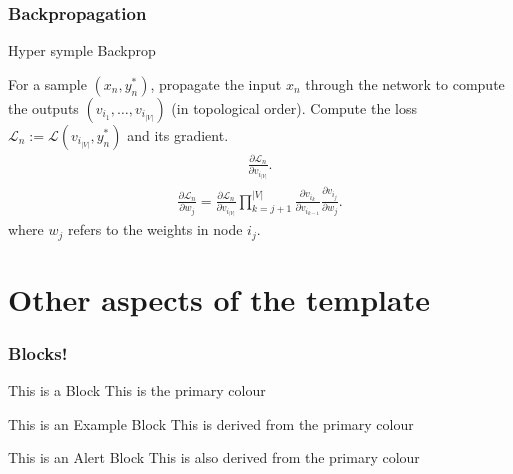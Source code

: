 \documentclass[10pt, aspectratio = 169]{beamer} %
\begin{document}
\begin{frame}
	\frametitle{Backpropagation}
	\begin{algorithm}[H]
		\caption{Hyper symple Backprop}
		\begin{algorithmic}
			\small
			\State For a sample $(x_n ,y^*_n)$, propagate the input $x_n$ through the network to compute the outputs $(v_{i_1}, \ldots, v_{i_{|V|}})$ (in topological order).
			\vspace{0.2cm}
			\State Compute the loss $\mathcal{L}_n := \mathcal{L}(v_{i_{|V|}}, y_n^*)$ and its gradient.
			\begin{align}
				\frac{\partial \mathcal{L}_n}{\partial v_{i_{|V|}}}.
			\end{align}
				\begin{align}
					\frac{\partial \mathcal{L}_n}{\partial w_j} =
					\frac{\partial \mathcal{L}_n}{\partial v_{i_{|V|}}} \prod_{k = j + 1}^{|V|} \frac{\partial v_{i_k}}{\partial v_{i_{k - 1}}}
					\frac{\partial v_{i_j}}{\partial w_j}.
				\end{align}
				where $w_j$ refers to the weights in node $i_j$.
			\EndFor			
		\end{algorithmic}
	\end{algorithm}
\end{frame}

\section{Other aspects of the template}
\begin{frame}
    \frametitle{Blocks!}
    \begin{block}{This is a Block}
        This is the primary colour
    \end{block}
    \pause
    \begin{exampleblock}{This is an Example Block}
        This is derived from the primary colour
    \end{exampleblock}
    \pause
    \begin{alertblock}{This is an Alert Block}
        This is also derived from the primary colour
    \end{alertblock}
\end{frame}
\end{document}
